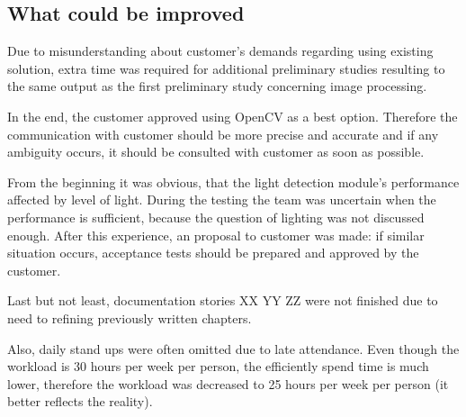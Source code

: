 \subsection{What could be improved}
Due to misunderstanding about customer's demands regarding using existing solution, extra time was required for additional preliminary studies resulting to the same output as the first preliminary study concerning image processing. 

In the end, the customer approved using OpenCV as a best option.
Therefore the communication with customer should be more precise and accurate and if any ambiguity occurs, it should be consulted with customer as soon as possible.

From the beginning it was obvious, that the light detection module's performance affected by level of light.
During the testing the team was uncertain when the performance is sufficient, because the question of lighting was not discussed enough.
After this experience, an proposal to customer was made: if similar situation occurs, acceptance tests should be prepared and approved by the customer.

Last but not least, documentation stories XX YY ZZ were not finished due to need to refining previously written chapters.

Also, daily stand ups were often omitted due to late attendance.
Even though the workload is 30 hours per week per person, the efficiently spend time is much lower, therefore the workload was decreased to 25 hours per week per person (it better reflects the reality).
